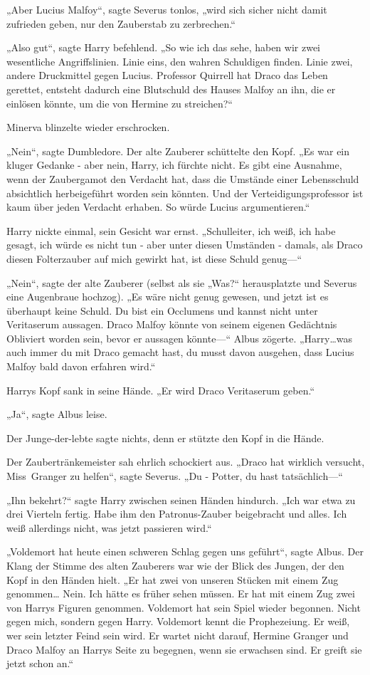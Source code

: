 {„Aber Lucius Malfoy“, sagte Severus tonlos, „wird sich sicher nicht damit zufrieden geben, nur den Zauberstab zu zerbrechen.“

„Also gut“, sagte Harry befehlend. „So wie ich das sehe, haben wir zwei wesentliche Angriffslinien. Linie eins, den wahren Schuldigen finden. Linie zwei, andere Druckmittel gegen Lucius. Professor Quirrell hat Draco das Leben gerettet, entsteht dadurch eine Blutschuld des Hauses Malfoy an ihn, die er einlösen könnte, um die von Hermine zu streichen?“

Minerva blinzelte wieder erschrocken.

„Nein“, sagte Dumbledore. Der alte Zauberer schüttelte den Kopf. „Es war ein kluger Gedanke - aber nein, Harry, ich fürchte nicht. Es gibt eine Ausnahme, wenn der Zaubergamot den Verdacht hat, dass die Umstände einer Lebensschuld absichtlich herbeigeführt worden sein könnten. Und der Verteidigungsprofessor ist kaum über jeden Verdacht erhaben. So würde Lucius argumentieren.“

Harry nickte einmal, sein Gesicht war ernst. „Schulleiter, ich weiß, ich habe gesagt, ich würde es nicht tun - aber unter diesen Umständen - damals, als Draco diesen Folterzauber auf mich gewirkt hat, ist diese Schuld genug—“

„Nein“, sagte der alte Zauberer (selbst als sie „Was?“ herausplatzte und Severus eine Augenbraue hochzog). „Es wäre nicht genug gewesen, und jetzt ist es überhaupt keine Schuld. Du bist ein Occlumens und kannst nicht unter Veritaserum aussagen. Draco Malfoy könnte von seinem eigenen Gedächtnis Obliviert worden sein, bevor er aussagen könnte—“ Albus zögerte. „Harry…was auch immer du mit Draco gemacht hast, du musst davon ausgehen, dass Lucius Malfoy bald davon erfahren wird.“

Harrys Kopf sank in seine Hände. „Er wird Draco Veritaserum geben.“

„Ja“, sagte Albus leise.

Der Junge-der-lebte sagte nichts, denn er stützte den Kopf in die Hände.

Der Zaubertränkemeister sah ehrlich schockiert aus. „Draco hat wirklich versucht, Miss~Granger zu helfen“, sagte Severus. „Du - Potter, du hast tatsächlich—“

„Ihn bekehrt?“ sagte Harry zwischen seinen Händen hindurch. „Ich war etwa zu drei Vierteln fertig. Habe ihm den Patronus-Zauber beigebracht und alles. Ich weiß allerdings nicht, was jetzt passieren wird.“

„Voldemort hat heute einen schweren Schlag gegen uns geführt“, sagte Albus. Der Klang der Stimme des alten Zauberers war wie der Blick des Jungen, der den Kopf in den Händen hielt. „Er hat zwei von unseren Stücken mit einem Zug genommen… Nein. Ich hätte es früher sehen müssen. Er hat mit einem Zug zwei von Harrys Figuren genommen. Voldemort hat sein Spiel wieder begonnen. Nicht gegen mich, sondern gegen Harry. Voldemort kennt die Prophezeiung. Er weiß, wer sein letzter Feind sein wird. Er wartet nicht darauf, Hermine Granger und Draco Malfoy an Harrys Seite zu begegnen, wenn sie erwachsen sind. Er greift sie jetzt schon an.“

}
